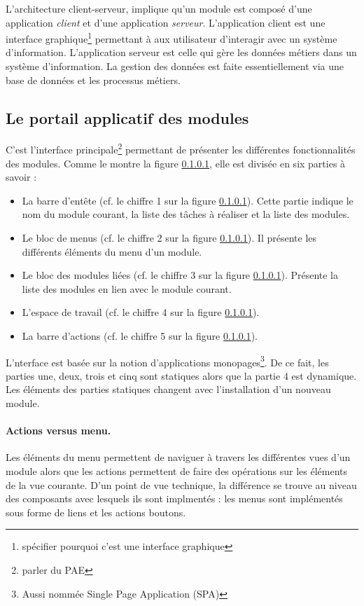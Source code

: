 \documentclass[a4paper,11pt]{report}
\begin{document}
L'architecture client-serveur, implique qu'un module est composé
d'une application {\em client} et d'une application {\em serveur}.
L'application client est une interface graphique\footnote{spécifier
  pourquoi c'est une interface graphique } permettant à
aux utilisateur d'interagir avec un système d'information.
L'application serveur est celle qui gère les données métiers dans un
système d'information.
La gestion des données est faite essentiellement via une base de
données et les processus métiers. 

\subsection{Le portail applicatif des modules}
C'est l'interface principale\footnote{parler du PAE} permettant de présenter les différentes
fonctionnalités des modules. Comme le montre la figure \ref{}, elle
est divisée en six parties à savoir :

\begin{itemize}
\item La barre d'entête (cf. le chiffre 1 sur la figure \ref{}). Cette
  partie indique le nom du module courant, la liste des tâches à
  réaliser et la liste des modules.
\item  Le bloc de menus  (cf. le chiffre 2 sur la figure \ref{}). Il
  présente les différents éléments du menu d'un module.
\item Le bloc des modules liées  (cf. le chiffre 3 sur la figure
  \ref{}). Présente la liste des modules en lien avec le module courant.
\item  L'espace de travail  (cf. le chiffre 4 sur la figure
  \ref{}).
  
\item La barre d'actions  (cf. le chiffre 5 sur la figure \ref{}). 
 
\end{itemize}

L'nterface est basée sur la notion d'applications
monopages\footnote{Aussi nommée Single Page Application (SPA) }.
De ce fait, les parties une, deux, trois et cinq sont statiques alors
que la partie 4 est dynamique. Les éléments des parties statiques
changent avec l'installation d'un nouveau module.
   
\paragraph{Actions versus menu.}
Les éléments du menu permettent de naviguer à travers les
différentes vues d'un module alors que les actions permettent de
faire des opérations sur les éléments de la vue courante. D'un point
de vue technique, la différence se trouve au niveau des composants avec
lesquels ils sont implmentés : les menus sont implémentés   sous forme
de liens et les actions boutons. 
\end{document}
